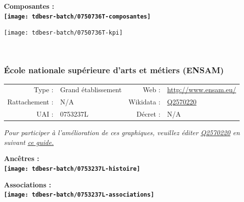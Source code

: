 \documentclass[12pt,french,]{article}
\begin{document}
\hrulefill

\begin{center} \bf Composantes : \\  
\texttt{[image: tdbesr-batch/0750736T-composantes]} \end{center}

\begin{center}\texttt{[image: tdbesr-batch/0750736T-kpi]} \end{center}\checkoddpage

\ifoddpage ~\newpage \fi   

\hypertarget{uxe9cole-nationale-supuxe9rieure-darts-et-muxe9tiers-ensam}{%
\subsubsection{École nationale supérieure d'arts et métiers
(ENSAM)}\label{uxe9cole-nationale-supuxe9rieure-darts-et-muxe9tiers-ensam}}

\begin{tabular*}{\textwidth}{rp{5cm}rl}  
\hline  
Type : & Grand établissement & Web : &\href{http://www.ensam.eu/}{http://www.ensam.eu/} \\  
Rattachement : & N/A & Wikidata : & \href{https://www.wikidata.org/entity/Q2570220}{Q2570220} \\  
UAI : & 0753237L & Décret : & N/A \\  
\hline  
\end{tabular*}

\textit{\scriptsize Pour participer à l'amélioration de ces graphiques, veuillez éditer  \href{https://www.wikidata.org/entity/Q2570220}{Q2570220}  en suivant \href{https://github.com/cpesr/wikidataESR/blob/master/Rmd/wikidataESR.md}{ce guide.}}

\vspace{1cm}  
\begin{minipage}[b]{0.50\textwidth}\begin{center} \bf Ancêtres : \\  
\texttt{[image: tdbesr-batch/0753237L-histoire]} \end{center}\end{minipage}\begin{minipage}[b]{0.50\textwidth}\begin{center} \bf Associations : \\  
\texttt{[image: tdbesr-batch/0753237L-associations]} \end{center}\end{minipage}
\end{document}
